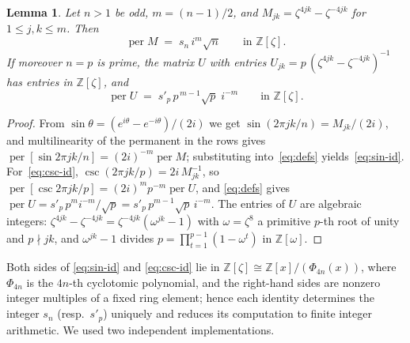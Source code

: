 \documentclass[10pt]{article}
\newtheorem{lemma}[theorem]{Lemma}
\theoremstyle{remark}
\DeclareMathOperator{\per}{per}
\newcommand{\Z}{\mathbb{Z}}
\begin{document}
\begin{lemma}\label{lem:cyclo}
Let $n>1$ be odd, $m=(n-1)/2$, and $M_{jk}=\zeta^{4jk}-\zeta^{-4jk}$ for
$1\le j,k\le m$. Then
\begin{equation}\label{eq:sin-id}
\per M \;=\; s_n\, i^{m}\sqrt n \qquad\text{in } \Z[\zeta].
\end{equation}
If moreover $n=p$ is prime, the matrix $U$ with entries
$U_{jk}=p\,(\zeta^{4jk}-\zeta^{-4jk})^{-1}$ has entries in $\Z[\zeta]$, and
\begin{equation}\label{eq:csc-id}
\per U \;=\; s'_p\, p^{\,m-1}\sqrt p\; i^{-m} \qquad\text{in } \Z[\zeta].
\end{equation}
\end{lemma}

\begin{proof}
From $\sin\theta=(e^{i\theta}-e^{-i\theta})/(2i)$ we get $\sin(2\pi
jk/n)=M_{jk}/(2i)$, and multilinearity of the permanent in the rows gives
$\per[\sin 2\pi jk/n]=(2i)^{-m}\per M$; substituting into~\eqref{eq:defs}
yields~\eqref{eq:sin-id}. For~\eqref{eq:csc-id}, $\csc(2\pi
jk/p)=2i\,M_{jk}^{-1}$, so $\per[\csc 2\pi jk/p]=(2i)^{m}p^{-m}\per U$, and
\eqref{eq:defs} gives $\per U=s'_p\,p^{m}i^{-m}/\sqrt p
=s'_p\,p^{m-1}\sqrt p\,i^{-m}$. The entries of $U$ are algebraic integers:
$\zeta^{4jk}-\zeta^{-4jk}=\zeta^{-4jk}(\omega^{jk}-1)$ with
$\omega=\zeta^{8}$ a primitive $p$-th root of unity and $p\nmid jk$, and
$\omega^{jk}-1$ divides $p=\prod_{t=1}^{p-1}(1-\omega^{t})$ in
$\Z[\omega]$.
\end{proof}

Both sides of \eqref{eq:sin-id} and \eqref{eq:csc-id} lie in $\Z[\zeta]
\cong \Z[x]/(\Phi_{4n}(x))$, where $\Phi_{4n}$ is the $4n$-th cyclotomic
polynomial, and the right-hand sides are nonzero integer multiples of a
fixed ring element; hence each identity determines the integer $s_n$
(resp.\ $s'_p$) uniquely and reduces its computation to finite integer
arithmetic. We used two independent implementations.
\end{document}
